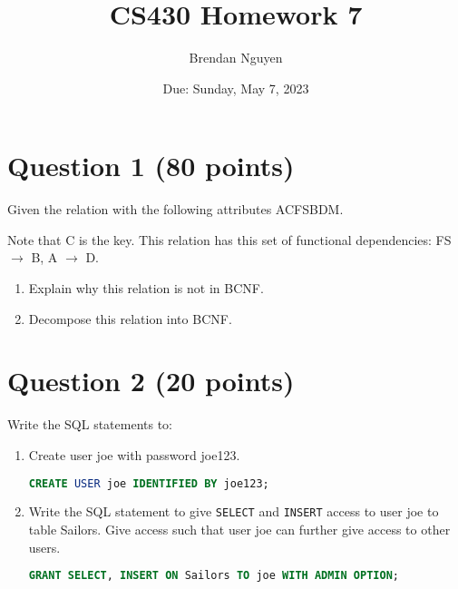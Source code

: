 \documentclass[letterpaper, 11pt]{article}
\title{CS430 Homework 7}
\author{Brendan Nguyen}
\date{Due: Sunday, May 7, 2023}
\begin{document}
\maketitle

\section*{Question 1 (80 points)}

Given the relation with the following attributes ACFSBDM.

Note that C is the key. This relation has this set of functional dependencies: FS $\to$ B, A $\to$ D.

\begin{enumerate}[label={\alph*}),leftmargin=*]
    \item Explain why this relation is not in BCNF.
    \item Decompose this relation into BCNF.
\end{enumerate}

\section*{Question 2 (20 points)}

Write the SQL statements to:
\begin{enumerate}[label={\alph*}),leftmargin=*]
    \item Create user joe with password joe123.

\begin{tcolorbox}
\begin{lstlisting}[language=SQL]
CREATE USER joe IDENTIFIED BY joe123;
\end{lstlisting}
\end{tcolorbox}

    \item Write the SQL statement to give \texttt{SELECT} and \texttt{INSERT} access to user joe to table Sailors. Give access such that user joe can further give access to other users. 

\begin{tcolorbox}
\begin{lstlisting}[language=SQL]
GRANT SELECT, INSERT ON Sailors TO joe WITH ADMIN OPTION;
\end{lstlisting}
\end{tcolorbox}
\end{enumerate}
\end{document}

